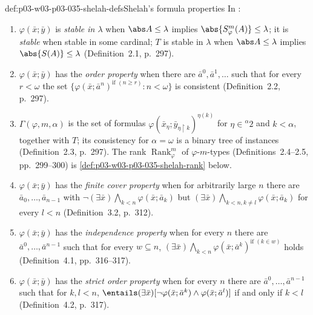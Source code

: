 \begin{hbdefinition}{def:p03-w03-p03-035-shelah-defs}{Shelah's formula properties}
In \cite{Shelah1971Stability}:
\begin{enumerate}
  \item \(\varphi(\bar x;\bar y)\) is \emph{stable in \(\lambda\)} when
        \(\abs A\leq\lambda\) implies \(\abs{S^m_\varphi(A)}\leq\lambda\);
        it is \emph{stable} when stable in some cardinal; \(T\) is stable in
        \(\lambda\) when \(\abs A\leq\lambda\) implies
        \(\abs{S(A)}\leq\lambda\) (Definition~2.1, p.~297).
  \item \(\varphi(\bar x;\bar y)\) has the \emph{order property} when there
        are \(\bar a^0,\bar a^1,\ldots\) such that for every \(r<\omega\)
        the set \(\{\varphi(\bar x;\bar a^n)^{\text{if }(n\geq r)}:n<\omega\}\)
        is consistent (Definition~2.2, p.~297).
  \item \(\Gamma(\varphi,m,\alpha)\) is the set of formulas
        \(\varphi(\bar x_\eta;\bar y_{\eta\restriction k})^{\eta(k)}\) for
        \(\eta\in{}^{\alpha}2\) and \(k<\alpha\), together with \(T\); its
        consistency for \(\alpha=\omega\) is a binary tree of instances
        (Definition~2.3, p.~297).  The rank
        \(\operatorname{Rank}^m_\varphi\) of \(\varphi\)-\(m\)-types
        (Definitions~2.4--2.5, pp.~299--300) is
        \cref{def:p03-w03-p03-035-shelah-rank} below.
  \item \(\varphi(\bar x;\bar y)\) has the \emph{finite cover property}
        when for arbitrarily large \(n\) there are \(\bar a_0,\ldots,\bar
        a_{n-1}\) with \(\neg(\exists\bar x)\bigwedge_{k<n}\varphi(\bar
        x;\bar a_k)\) but \((\exists\bar x)\bigwedge_{k<n,k\neq l}\varphi(\bar
        x;\bar a_k)\) for every \(l<n\) (Definition~3.2, p.~312).
  \item \(\varphi(\bar x;\bar y)\) has the \emph{independence property}
        when for every \(n\) there are \(\bar a^0,\ldots,\bar a^{n-1}\) such
        that for every \(w\subseteq n\),
        \((\exists\bar x)\bigwedge_{k<n}\varphi(\bar x;\bar a^k)^{\text{if }(k\in w)}\)
        holds (Definition~4.1, pp.~316--317).
  \item \(\varphi(\bar x;\bar y)\) has the \emph{strict order property}
        when for every \(n\) there are \(\bar a^0,\ldots,\bar a^{n-1}\) such
        that for \(k,l<n\),
        \(\entails(\exists\bar x)[\neg\varphi(\bar x;\bar a^k)\wedge\varphi(\bar x;\bar a^l)]\)
        if and only if \(k<l\) (Definition~4.2, p.~317).
\end{enumerate}
\end{hbdefinition}

